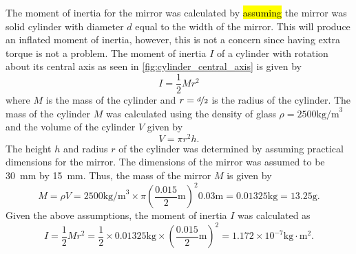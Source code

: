 The moment of inertia for the mirror was calculated by \hl{assuming} the mirror was solid cylinder with diameter $d$ equal to the width of the mirror. This will produce an inflated moment of inertia, however, this is not a concern since having extra torque is not a problem. The moment of inertia $I$ of a cylinder with rotation about its central axis as seen in \autoref{fig:cylinder_central_axis} is given by
\begin{equation}
    I = \frac{1}{2}Mr^2
    \label{eq:moment_of_inertia}
\end{equation}
where $M$ is the mass of the cylinder and $r = \nicefrac{d}{2}$ is the radius of the cylinder. The mass of the cylinder $M$ was calculated using the density of glass $\rho = 2500 \text{kg/m}^3$ and the volume of the cylinder $V$ given by
\begin{equation}
    V = \pi r^2 h.
    \label{eq:cylinder_volume}
\end{equation}
The height $h$ and radius $r$ of the cylinder was determined by assuming practical dimensions for the mirror. The dimensions of the mirror was assumed to be 30~mm by 15~mm. Thus, the mass of the mirror $M$ is given by
\begin{equation}
    M = \rho V = 2500 \text{kg/m}^3 \times \pi \left(\frac{0.015}{2} \text{m}\right)^2 0.03 \text{m} = 0.01325 \text{kg} = 13.25 \text{g}.
    \label{eq:cylinder_mass}
\end{equation}
Given the above assumptions, the moment of inertia $I$ was calculated as
\begin{equation}
    I = \frac{1}{2}Mr^2 = \frac{1}{2} \times 0.01325 \text{kg} \times \left(\frac{0.015}{2} \text{m}\right)^2 = 1.172 \times 10^{-7} \text{kg} \cdot \text{m}^2.
    \label{eq:cylinder_moment_of_inertia}
\end{equation}

